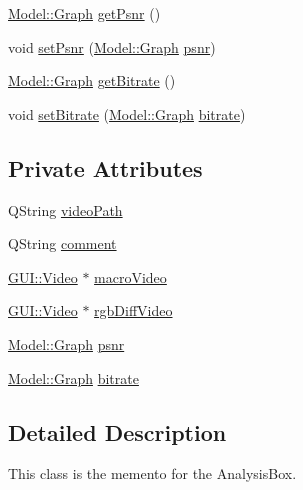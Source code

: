 \begin{DoxyCompactItemize}
\item 
\hyperlink{classModel_1_1Graph}{Model\+::\+Graph} \hyperlink{classMemento_1_1AnalysisBoxMemento_abe7002bc369445d950a091d3aaff2e3b}{get\+Psnr} ()
\item 
void \hyperlink{classMemento_1_1AnalysisBoxMemento_adb9a486711e0f4b61bf596cc749bcbe4}{set\+Psnr} (\hyperlink{classModel_1_1Graph}{Model\+::\+Graph} \hyperlink{classMemento_1_1AnalysisBoxMemento_a821d800ecc19687ec517c6f92852abdc}{psnr})
\item 
\hyperlink{classModel_1_1Graph}{Model\+::\+Graph} \hyperlink{classMemento_1_1AnalysisBoxMemento_a309d723763c8ea7b860b79b203f14ce0}{get\+Bitrate} ()
\item 
void \hyperlink{classMemento_1_1AnalysisBoxMemento_a3a4987e46d417afa31c5e340942dfd80}{set\+Bitrate} (\hyperlink{classModel_1_1Graph}{Model\+::\+Graph} \hyperlink{classMemento_1_1AnalysisBoxMemento_a39330578f6bbb21b79102b742d66d0cc}{bitrate})
\end{DoxyCompactItemize}
\subsection*{Private Attributes}
\begin{DoxyCompactItemize}
\item 
Q\+String \hyperlink{classMemento_1_1AnalysisBoxMemento_afc033233083db464632d21547252969c}{video\+Path}
\item 
Q\+String \hyperlink{classMemento_1_1AnalysisBoxMemento_a2651941ce2706f4b08fef7dffdfe89cb}{comment}
\item 
\hyperlink{classGUI_1_1Video}{G\+U\+I\+::\+Video} $\ast$ \hyperlink{classMemento_1_1AnalysisBoxMemento_a25f988e50e50ec3e3d41b52b007db0ad}{macro\+Video}
\item 
\hyperlink{classGUI_1_1Video}{G\+U\+I\+::\+Video} $\ast$ \hyperlink{classMemento_1_1AnalysisBoxMemento_a100339bd02ee160a9cd848016e84adc7}{rgb\+Diff\+Video}
\item 
\hyperlink{classModel_1_1Graph}{Model\+::\+Graph} \hyperlink{classMemento_1_1AnalysisBoxMemento_a821d800ecc19687ec517c6f92852abdc}{psnr}
\item 
\hyperlink{classModel_1_1Graph}{Model\+::\+Graph} \hyperlink{classMemento_1_1AnalysisBoxMemento_a39330578f6bbb21b79102b742d66d0cc}{bitrate}
\end{DoxyCompactItemize}


\subsection{Detailed Description}
This class is the memento for the Analysis\+Box. 

